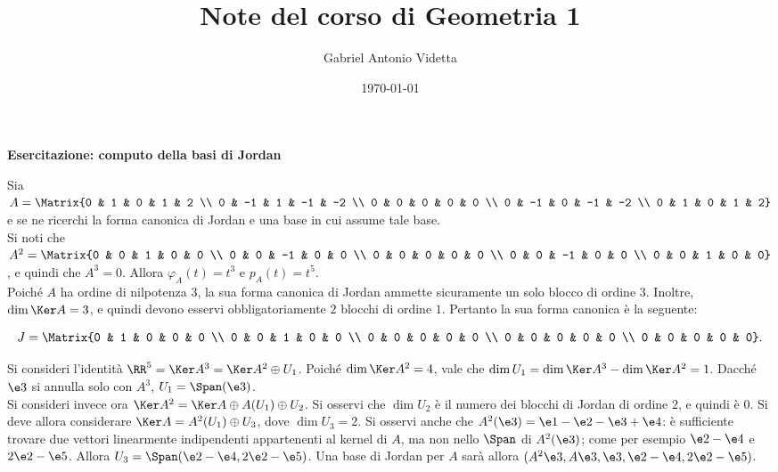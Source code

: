 \documentclass[11pt]{article}
\title{\textbf{Note del corso di Geometria 1}}
\author{Gabriel Antonio Videtta}
\date{\today}
\begin{document}
	
	\maketitle
	
	\wip
	
	\begin{center}
		\Large \textbf{Esercitazione: computo della basi di Jordan}
	\end{center}

	\begin{example}
		Sia $A = \Matrix{0 & 1 & 0 & 1 & 2 \\ 0 & -1 & 1 & -1 & -2 \\ 0 & 0 & 0 & 0 & 0 \\ 0 & -1 & 0 & -1 & -2 \\ 0 & 1 & 0 & 1 & 2}$ e se ne ricerchi
		la forma canonica di Jordan e una base in cui assume tale base. \\
		
		Si noti che $A^2 = \Matrix{0 & 0 & 1 & 0 & 0 \\ 0 & 0 & -1 & 0 & 0 \\ 0 & 0 & 0 & 0 & 0 \\ 0 & 0 & -1 & 0 & 0 \\ 0 & 0 & 1 & 0 & 0}$, e quindi
		che $A^3 = 0$. Allora $\varphi_A(t) = t^3$ e $p_A(t) = t^5$. \\
		
		Poiché $A$ ha ordine di nilpotenza $3$, la sua forma canonica
		di Jordan ammette sicuramente un solo blocco
		di ordine $3$. Inoltre, $\dim \Ker A = 3$, e quindi
		devono esservi obbligatoriamente $2$ blocchi di ordine $1$.
		Pertanto la sua forma canonica è la seguente:
		
		\[ J=\Matrix{0 & 1 & 0 & 0 & 0 \\ 0 & 0 & 1 & 0 & 0 \\ 0 & 0 & 0 & 0 & 0 \\ 0 & 0 & 0 & 0 & 0 \\ 0 & 0 & 0 & 0 & 0}. \]
		
		\vskip 0.05in
		
		Si consideri l'identità $\RR^5 = \Ker A^3 = \Ker A^2 \oplus U_1$.
		Poiché $\dim \Ker A^2 = 4$, vale che $\dim U_1 = \dim \Ker A^3
		- \dim \Ker A^2 = 1$. Dacché $\e3$ si annulla solo con $A^3$,
		$U_1 = \Span(\e3)$. \\
		
		Si consideri invece ora $\Ker A^2 = \Ker A \oplus A(U_1) \oplus U_2$.
		Si osservi che $\dim U_2$ è il numero dei blocchi di Jordan di
		ordine $2$, e quindi è $0$. Si deve allora considerare $\Ker A =
		A^2(U_1) \oplus U_3$, dove $\dim U_3 = 2$. Si osservi anche che $A^2(\e3) = \e1-\e2-\e3+\e4$: è sufficiente trovare due vettori
		linearmente indipendenti appartenenti al kernel di $A$, ma non
		nello $\Span$ di $A^2(\e3)$; come per esempio $\e2-\e4$ e $2\e2-\e5$.
		Allora $U_3 = \Span(\e2-\e4, 2\e2-\e5)$. Una base di Jordan per $A$
		sarà allora $(A^2 \e3, A \e3, \e3, \e2-\e4, 2\e2-\e5)$.
	\end{example}
\end{document}
